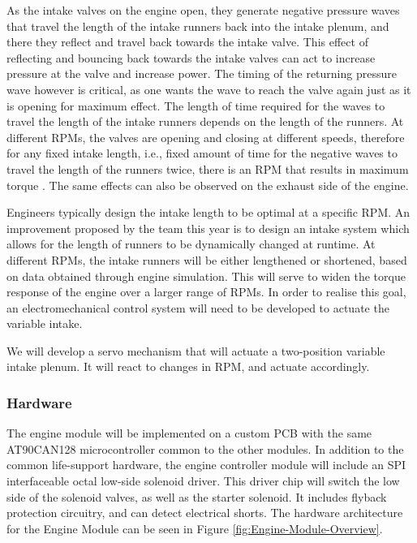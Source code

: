 As the intake valves on the engine open, they generate negative pressure waves that travel the length of the intake runners back into the intake plenum, and there they reflect and travel back towards the intake valve. This effect of reflecting and bouncing back towards the intake valves can act to increase pressure at the valve and increase power. The timing of the returning pressure wave however is critical, as one wants the wave to reach the valve again just as it is opening for maximum effect. The length of time required for the waves to travel the length of the intake runners depends on the length of the runners. At different RPMs, the valves are opening and closing at different speeds, therefore for any fixed intake length, i.e., fixed amount of time for the negative waves to travel the length of the runners twice, there is an RPM that results in maximum torque \cite{Modelingof20}. The same effects can also be observed on the exhaust side of the engine.

Engineers typically design the intake length to be optimal at a specific RPM. An improvement proposed by the team this year is to design an intake system which allows for the length of runners to be dynamically changed at runtime. At different RPMs, the intake runners will be either lengthened or shortened, based on data obtained through engine simulation. This will serve to widen the torque response of the engine over a larger range of RPMs. In order to realise this goal, an electromechanical control system will need to be developed to actuate the variable intake.

We will develop a servo mechanism that will actuate a two-position variable intake plenum. It will react to changes in RPM, and actuate accordingly.

\subsubsection{Hardware}

The engine module will be implemented on a custom PCB with the same AT90CAN128 microcontroller common to the other modules. In addition to the common life-support hardware, the engine controller module will include an SPI interfaceable octal low-side solenoid driver. This driver chip will switch the low side of the solenoid valves, as well as the starter solenoid. It includes flyback protection circuitry, and can detect electrical shorts. The hardware architecture for the Engine Module can be seen in Figure \ref{fig:Engine-Module-Overview}.


